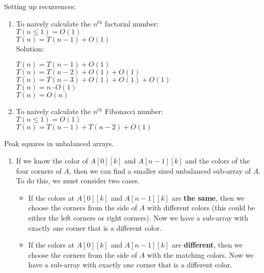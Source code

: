 \documentclass[12pt,twoside]{article}
\begin{document}
\begin{problems}
\begin{problemparts}
\begin{enumerate}
\end{enumerate}


\problempart Setting up recurrences:
\begin{enumerate}
	
	\item To naively calculate the $n^{th}$ factorial number: \\
	$T(n\leq1) = O(1)$ \\
	$T(n) = T(n-1) + O(1)$ \\
	
Solution:
\begin{center}
$ T(n) = T(n-1) + O(1)$\\
$ T(n) = T(n-2) + O(1) + O(1)$\\
$ T(n) = T(n-3) + O(1) + O(1) + O(1)$\\
$ T(n) = n \cdot O(1)$ \\
$ T(n) = O(n)$ \\
 \end{center}

	\item To naively calculate the $n^{th}$ Fibonacci number: \\
	$T(n\leq1) = O(1)$ \\
	$T(n) = T(n-1) + T(n-2) + O(1)$\\

\end{enumerate}
\end{problemparts}




\problem  %

\begin{problemparts}
\problempart Peak squares in unbalanced arrays.

\begin {enumerate}
	\item If we know the color of $A[0][k]$ and $A[n-1][k]$ and the colors of the four corners of $A$, then we can find a smaller sized unbalanced sub-array of $A$. To do this, we must consider two cases.
	\begin {itemize}
		\item If the colors at $A[0][k]$ and $A[n-1][k]$ are {\bf the same}, then we choose the corners from the side of $A$ with different colors (this could be either the left corners or right corners). Now we have a sub-array with exactly one corner that is a different color.
		
		\item If the colors at $A[0][k]$ and $A[n-1][k]$ are {\bf different}, then we choose the corners from the side of $A$ with the matching colors. Now we have a sub-array with exactly one corner that is a different color.
	

\end{itemize}
\end{enumerate}
\end{problemparts}
\end{problems}
\end{document}
